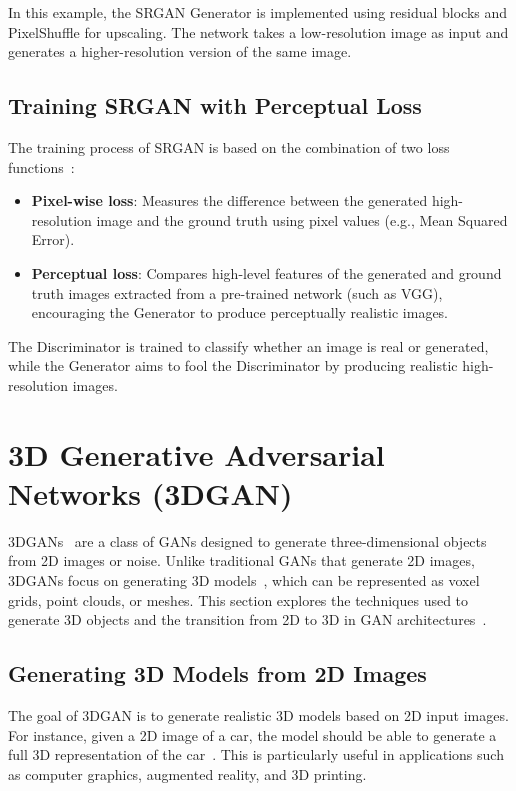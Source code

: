 In this example, the SRGAN Generator is implemented using residual blocks and PixelShuffle for upscaling. The network takes a low-resolution image as input and generates a higher-resolution version of the same image.

\subsection{Training SRGAN with Perceptual Loss}
The training process of SRGAN is based on the combination of two loss functions~\cite{wang2018esrgan}:

\begin{itemize}
    \item \textbf{Pixel-wise loss}: Measures the difference between the generated high-resolution image and the ground truth using pixel values (e.g., Mean Squared Error).
    \item \textbf{Perceptual loss}: Compares high-level features of the generated and ground truth images extracted from a pre-trained network (such as VGG), encouraging the Generator to produce perceptually realistic images.
\end{itemize}

The Discriminator is trained to classify whether an image is real or generated, while the Generator aims to fool the Discriminator by producing realistic high-resolution images.

\section{3D Generative Adversarial Networks (3DGAN)}
3DGANs~\cite{wu2016learning} are a class of GANs designed to generate three-dimensional objects from 2D images or noise. Unlike traditional GANs that generate 2D images, 3DGANs focus on generating 3D models~\cite{smith2017improved}, which can be represented as voxel grids, point clouds, or meshes. This section explores the techniques used to generate 3D objects and the transition from 2D to 3D in GAN architectures~\cite{chan2022efficient}.

\subsection{Generating 3D Models from 2D Images}
The goal of 3DGAN is to generate realistic 3D models based on 2D input images. For instance, given a 2D image of a car, the model should be able to generate a full 3D representation of the car~\cite{wu2016learning}. This is particularly useful in applications such as computer graphics, augmented reality, and 3D printing.

